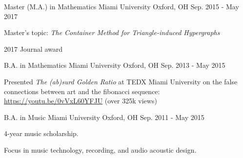 

\begin{cventries}

  \cventry
    {Master (M.A.) in Mathematics} %
    {Miami University} %
    {Oxford, OH} %
    {Sep. 2015 - May 2017} %
    {
      \begin{cvitems} %
        \item {Master's topic: {\it The Container Method for Triangle-induced Hypergraphs}}
        \item {2017 Journal award}
      \end{cvitems}
    }

  \cventry
    {B.A. in Mathematics} %
    {Miami University} %
    {Oxford, OH} %
    {Sep. 2013 - May 2015} %
    {
      \begin{cvitems} %
      \item {Presented {\it The (ab)surd Golden Ratio} at TEDX Miami
          University on the false connections between art and the
          fibonacci sequence: \url{https://youtu.be/0vVxL60YFJU} (over
          325k views)}
      \end{cvitems}
    }

  \cventry
    {B.A. in Music} %
    {Miami University} %
    {Oxford, OH} %
    {Sep. 2011 - May 2015} %
    {
      \begin{cvitems} %
        \item {4-year music scholarship.}
        \item {Focus in music technology, recording, and audio acoustic design.}
      \end{cvitems}
    }
\end{cventries}
